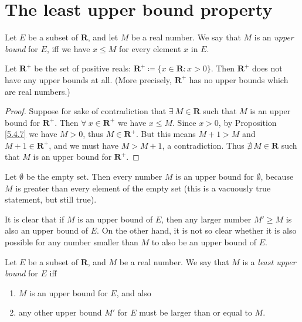 \section{The least upper bound property}\label{sec 5.5}

\begin{definition}\label{5.5.1}
    Let \(E\) be a subset of \(\mathbf{R}\), and let \(M\) be a real number.
    We say that \(M\) is an \emph{upper bound} for \(E\), iff we have \(x \leq M\) for every element \(x\) in \(E\).
\end{definition}

\setcounter{theorem}{2}
\begin{example}\label{5.5.3}
    Let \(\mathbf{R}^+\) be the set of positive reals: \(\mathbf{R}^+ \coloneqq \{x \in \mathbf{R} : x > 0\}\).
    Then \(\mathbf{R}^+\) does not have any upper bounds at all.
    (More precisely, \(\mathbf{R}^+\) has no upper bounds which are real numbers.)
\end{example}

\begin{proof}
    Suppose for sake of contradiction that \(\exists\ M \in \mathbf{R}\) such that \(M\) is an upper bound for \(\mathbf{R}^+\).
    Then \(\forall\ x \in \mathbf{R}^+\) we have \(x \leq M\).
    Since \(x > 0\), by Proposition \ref{5.4.7} we have \(M > 0\), thus \(M \in \mathbf{R}^+\).
    But this means \(M + 1 > M\) and \(M + 1 \in \mathbf{R}^+\), and we must have \(M > M + 1\), a contradiction.
    Thus \(\nexists\ M \in \mathbf{R}\) such that \(M\) is an upper bound for \(\mathbf{R}^+\).
\end{proof}

\begin{example}\label{5.5.4}
    Let \(\emptyset\) be the empty set.
    Then every number \(M\) is an upper bound for \(\emptyset\), because \(M\) is greater than every element of the empty set
    (this is a vacuously true statement, but still true).
\end{example}

\begin{note}
    It is clear that if \(M\) is an upper bound of \(E\), then any larger number \(M' \geq M\) is also an upper bound of \(E\).
    On the other hand, it is not so clear whether it is also possible for any number smaller than \(M\) to also be an upper bound of \(E\).
\end{note}

\begin{definition}\label{5.5.5}
    Let \(E\) be a subset of \(\mathbf{R}\), and \(M\) be a real number.
    We say that \(M\) is a \emph{least upper bound} for \(E\) iff
    \begin{enumerate}
        \item \(M\) is an upper bound for \(E\), and also
        \item any other upper bound \(M'\) for \(E\) must be larger than or equal to \(M\).
    \end{enumerate}
\end{definition}

